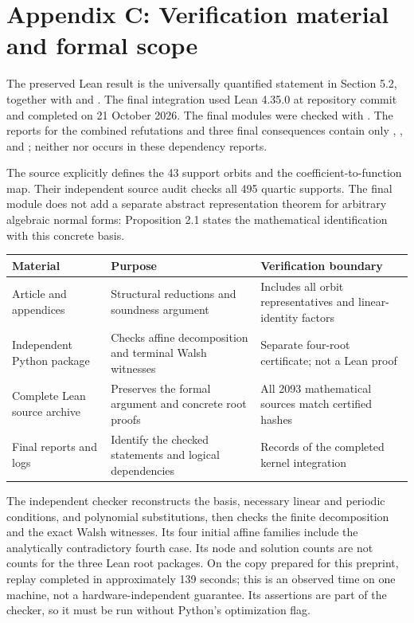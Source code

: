 \documentclass[11pt,a4paper]{article}
\begin{document}
\section*{Appendix C: Verification material and formal scope}

The preserved Lean result is the universally quantified statement in Section 5.2, together with  and . The final integration used Lean 4.35.0 at repository commit  and completed on 21 October 2026. The final modules were checked with . The reports for the combined refutations and three final consequences contain only , , and ; neither  nor  occurs in these dependency reports.

The source explicitly defines the 43 support orbits and the coefficient-to-function map. Their independent source audit checks all 495 quartic supports. The final module does not add a separate abstract representation theorem for arbitrary algebraic normal forms: Proposition 2.1 states the mathematical identification with this concrete basis.

\begin{center}
\small
\begin{longtable}{>{\raggedright\arraybackslash}p{.20\linewidth}>{\raggedright\arraybackslash}p{.34\linewidth}>{\raggedright\arraybackslash}p{.34\linewidth}}
\toprule
Material & Purpose & Verification boundary \\
\midrule\endhead
Article and appendices & Structural reductions and soundness argument & Includes all orbit representatives and linear-identity factors \\
Independent Python package & Checks affine decomposition and terminal Walsh witnesses & Separate four-root certificate; not a Lean proof \\
Complete Lean source archive & Preserves the formal argument and concrete root proofs & All 2093 mathematical sources match certified hashes \\
Final reports and logs & Identify the checked statements and logical dependencies & Records of the completed kernel integration \\
\bottomrule
\end{longtable}
\end{center}

The independent checker reconstructs the basis, necessary linear and periodic conditions, and polynomial substitutions, then checks the finite decomposition and the exact Walsh witnesses. Its four initial affine families include the analytically contradictory fourth case. Its node and solution counts are not counts for the three Lean root packages. On the copy prepared for this preprint, replay completed in approximately 139 seconds; this is an observed time on one machine, not a hardware-independent guarantee. Its assertions are part of the checker, so it must be run without Python's optimization flag.
\end{document}
